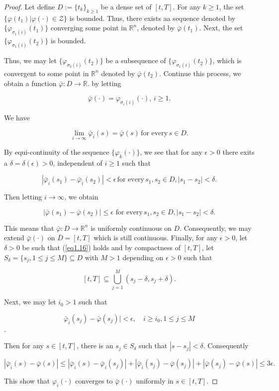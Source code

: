 \begin{proof}
Let define $D:=\{t_k\}_{k\geq 1}$ be a dense set of $[t,T]$. For any $k\geq 1$, the set $\{\varphi(t_1)|\varphi(\cdot)\in \mathcal{Z}\}$ is bounded. Thus, there exists aa sequence denoted by $\{\varphi_{\sigma_1(i)}(t_1)\}$ converging some point in $\mathbb{R}^n$, denoted by $\bar{\varphi}(t_1)$. Next, the set $\{\varphi_{\sigma_1(i)}(t_2)\}$ is bounded.

Thus, we may let $\{\varphi_{\sigma_2(i)}(t_2)\}$ be a subsequence of $\{\varphi_{\sigma_1(i)}(t_2)\}$, which is convergent to some point in $\mathbb{R}^n$ denoted by $\bar{\varphi}(t_2)$. Continue this process, we obtain a function $\bar{\varphi}:D\rightarrow \mathbb{R}$. by letting

$$\bar{\varphi}(\cdot)=\varphi_{\sigma_i(i)}(\cdot),\, i\geq 1.$$

We have 

$$\lim_{i\rightarrow \infty} \bar{\varphi}_i(s)=\bar{\varphi}(s)\,\mbox{for every}\, s\in D.$$

By equi-continuity of the sequence $\{\varphi_k(\cdot)\}$, we see that for any $\epsilon>0$ there exits a $\delta=\delta(\epsilon)>0$, independent of $i\geq 1$ such that

\begin{equation}\label{eq1.16}
	|\bar{\varphi}_i(s_1)-\bar{\varphi}_i(s_2)|<\epsilon\, \mbox{for every}\, s_1,s_2\in D, |s_1-s_2|<\delta.
\end{equation}

Then letting $i\rightarrow \infty$, we obtain

$$|\bar{\varphi}(s_1)-\bar{\varphi}(s_2)|\leq \epsilon\,\, \mbox{for every}\, s_1,s_2\in D, |s_1-s_2|<\delta.$$

This means that $\bar{\varphi}:D\rightarrow \mathbb{R}^n$ is uniformly continuous on $D$. Consequently, we may extend $\bar{\varphi}(\cdot)$ on $\bar{D}=[t,T]$ which is still continuous. Finally, for any $\epsilon>0$, let $\delta>0$ be such that (\ref{eq1.16}) holds and by compactness of $[t,T]$, let $S_{\delta}=\{s_j,1\leq j\leq M\}\subseteq D$ with $M>1$ depending on $\epsilon>0$ such that

$$[t,T]\subseteq \bigcup^M_{j=1}(s_j-\delta,s_j+\delta).$$

Next, we may let $i_0>1$ such that


	$$
	    \bar{\varphi}_i(s_j)-\bar{\varphi}(s_j)|<\epsilon, 
	    \quad
	    i\geq i_0, 1\leq j\leq M
	$$.


Then for any $s\in [t,T]$, there is an $s_j\in S_{\delta}$ such that $|s-s_j|<\delta$. Consequently 

$$|\bar{\varphi}_i(s)-\bar{\varphi}(s)|\leq |\bar{\varphi}_i(s)-\bar{\varphi}_i(s_j)|+|\bar{\varphi}_i(s_j)-\bar{\varphi}(s_j)|+|\bar{\varphi}(s_j)-\bar{\varphi}(s)|\leq 3\epsilon.$$

This show that $\varphi_i(\cdot)$ converges to $\bar{\varphi} (\cdot)$ uniformly  in $s\in [t,T]$.
\end{proof}

